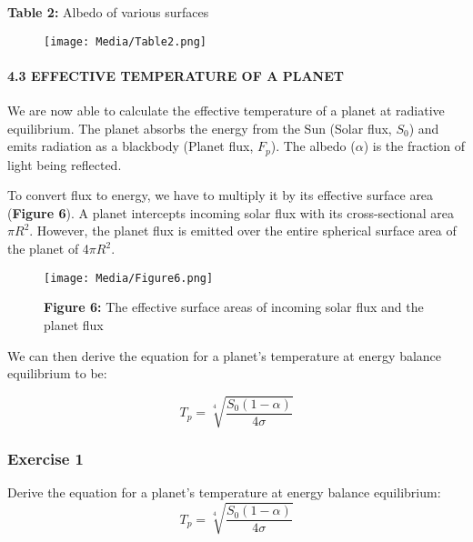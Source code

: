 \documentclass[
  letterpaper,
  DIV=11,
  numbers=noendperiod]{scrartcl}
\let\oldparagraph\paragraph
\renewcommand{\paragraph}[1]{\oldparagraph{#1}\mbox{}}
\begin{document}
\textbf{Table 2:} Albedo of various surfaces

\begin{figure}

{\centering \texttt{[image: Media/Table2.png]}

}

\end{figure}

\hypertarget{effective-temperature-of-a-planet}{%
\paragraph{4.3 EFFECTIVE TEMPERATURE OF A
PLANET}\label{effective-temperature-of-a-planet}}

We are now able to calculate the effective temperature of a planet at
radiative equilibrium. The planet absorbs the energy from the Sun (Solar
flux, \(S_0\)) and emits radiation as a blackbody (Planet flux,
\(F_p\)). The albedo (\(\alpha\)) is the fraction of light being
reflected.

To convert flux to energy, we have to multiply it by its effective
surface area (\textbf{Figure 6}). A planet intercepts incoming solar
flux with its cross-sectional area \(\pi R^2\). However, the planet flux
is emitted over the entire spherical surface area of the planet of
4\(\pi R^2\).

\begin{figure}

{\centering \texttt{[image: Media/Figure6.png]}

}

\caption{\textbf{Figure 6:} The effective surface areas of incoming
solar flux and the planet flux}

\end{figure}

We can then derive the equation for a planet's temperature at energy
balance equilibrium to be:

\begin{equation}
\tag{5}
T_{p} = \sqrt[4]{\frac{S_0(1-\alpha)}{4\sigma}}
\end{equation}

\subsubsection{\texorpdfstring{\textbf{Exercise 1}}{Exercise 1}}

Derive the equation for a planet's temperature at energy balance
equilibrium: \[T_{p} = \sqrt[4]{\frac{S_0(1-\alpha)}{4\sigma}}\]
\end{document}

